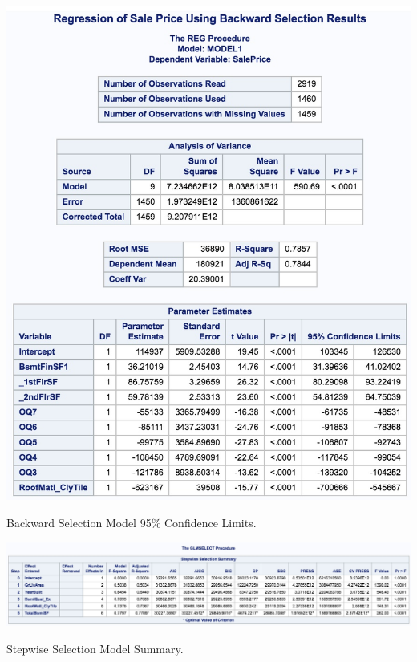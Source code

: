 \documentclass[11pt]{scrartcl} %
\begin{document}
\begin{table}[H] %
	\centering %
	\includegraphics[scale=.3]{../graphics/A2BWCI}
	\caption{Backward Selection Model 95\% Confidence Limits.}
	\label{tab:A2BWCI}
\end{table}
\hrulefill
\begin{table}[H] %
	\centering %
	\includegraphics[scale=.25]{../graphics/A2SWfeatures}
	\caption{Stepwise Selection Model Summary.}
	\label{tab:A2SWsummary}
\end{table}
\hrulefill
\end{document}
